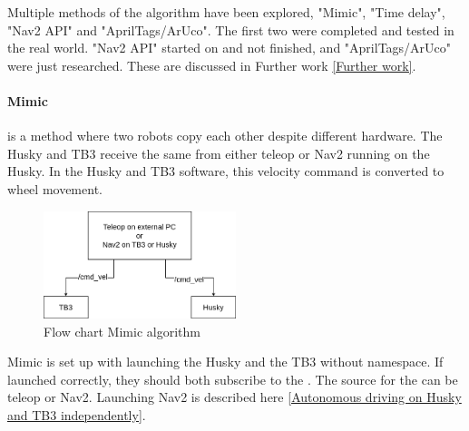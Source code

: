 Multiple methods of the algorithm have been explored, "Mimic", "Time delay", "Nav2 API" and "AprilTags/ArUco". The first two were completed and tested in the real world. "Nav2 API" started on and not finished, and "AprilTags/ArUco" were just researched. These are discussed in Further work \ref{Further work}. 

\paragraph{Mimic} \label{Mimic} is a method where two robots copy each other despite different hardware. The Husky and TB3 receive the same  from either teleop or Nav2 running on the Husky. In the Husky and TB3 software, this velocity command is converted to wheel movement.  

\begin{figure}[H]
    \centering
    \includegraphics[width = 0.5\textwidth]{Figures/drawio/FlowChart_Mimic.drawio.png}
    \caption{Flow chart Mimic algorithm}
    \label{fig:FlowMimic}
\end{figure}

Mimic is set up with launching the Husky and the TB3 without namespace. If launched correctly, they should both subscribe to the . The source for the  can be teleop or Nav2. Launching Nav2 is described here \ref{Autonomous driving on Husky and TB3 independently}. 

